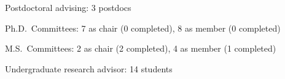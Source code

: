 \begin{veryTightItemize}
    \item Postdoctoral advising: 3 postdocs
    \item Ph.D.\ Committees: 7 as chair (0 completed), 8 as member (0 completed)
    \item M.S.\ Committees:  2 as chair (2 completed), 4 as member (1 completed)
    \item Undergraduate research advisor: 14 students
\end{veryTightItemize}

